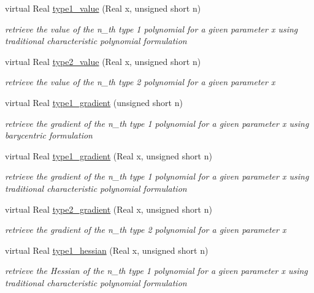 \begin{DoxyCompactItemize}
virtual Real \hyperlink{classPecos_1_1BasisPolynomial_a1fab871e99cec3a1933a2b1e9ed8a625}{type1\+\_\+value} (Real x, unsigned short n)
\begin{DoxyCompactList}\small\item\em retrieve the value of the n\+\_\+th type 1 polynomial for a given parameter x using traditional characteristic polynomial formulation \end{DoxyCompactList}\item 
virtual Real \hyperlink{classPecos_1_1BasisPolynomial_aecd19f4bde44ba0cc371340405d81a18}{type2\+\_\+value} (Real x, unsigned short n)
\begin{DoxyCompactList}\small\item\em retrieve the value of the n\+\_\+th type 2 polynomial for a given parameter x \end{DoxyCompactList}\item 
virtual Real \hyperlink{classPecos_1_1BasisPolynomial_ac88b2920bdede895a618385160254741}{type1\+\_\+gradient} (unsigned short n)
\begin{DoxyCompactList}\small\item\em retrieve the gradient of the n\+\_\+th type 1 polynomial for a given parameter x using barycentric formulation \end{DoxyCompactList}\item 
virtual Real \hyperlink{classPecos_1_1BasisPolynomial_a6f69ec84983f551e7e0e4a18b78b4498}{type1\+\_\+gradient} (Real x, unsigned short n)
\begin{DoxyCompactList}\small\item\em retrieve the gradient of the n\+\_\+th type 1 polynomial for a given parameter x using traditional characteristic polynomial formulation \end{DoxyCompactList}\item 
virtual Real \hyperlink{classPecos_1_1BasisPolynomial_a3a6b82f9baaa857ff03ea5a63ff48cc8}{type2\+\_\+gradient} (Real x, unsigned short n)
\begin{DoxyCompactList}\small\item\em retrieve the gradient of the n\+\_\+th type 2 polynomial for a given parameter x \end{DoxyCompactList}\item 
virtual Real \hyperlink{classPecos_1_1BasisPolynomial_a07d617dad8572dd606371e6c89ab6c35}{type1\+\_\+hessian} (Real x, unsigned short n)
\begin{DoxyCompactList}\small\item\em retrieve the Hessian of the n\+\_\+th type 1 polynomial for a given parameter x using traditional characteristic polynomial formulation \end{DoxyCompactList}\item 

\end{DoxyCompactItemize}
